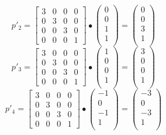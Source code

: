 \documentclass{article}
\begin{document}
	\[
		p'_{2} =
		\begin{bmatrix}
			3 & 0 & 0 & 0 \\
			0 & 3 & 0 & 0 \\
			0 & 0 & 3 & 0 \\
			0 & 0 & 0 & 1
		\end{bmatrix}
		\bullet
		\begin{pmatrix}
			0 \\ 0 \\ 1 \\ 1 \\
		\end{pmatrix}
		=
		\begin{pmatrix}
			0 \\ 0 \\ 3 \\ 1 \\
		\end{pmatrix}
	\]
	\[
		p'_{3} =
		\begin{bmatrix}
			3 & 0 & 0 & 0 \\
			0 & 3 & 0 & 0 \\
			0 & 0 & 3 & 0 \\
			0 & 0 & 0 & 1
		\end{bmatrix}
		\bullet
		\begin{pmatrix}
			1 \\ 0 \\ 0 \\ 1 \\
		\end{pmatrix}
		=
		\begin{pmatrix}
			3 \\ 0 \\ 0 \\ 1 \\
		\end{pmatrix}
	\]
	\[
		p'_{4} =
		\begin{bmatrix}
			3 & 0 & 0 & 0 \\
			0 & 3 & 0 & 0 \\
			0 & 0 & 3 & 0 \\
			0 & 0 & 0 & 1
		\end{bmatrix}
		\bullet
		\begin{pmatrix}
			-1 \\ 0 \\ -1 \\ 1 \\
		\end{pmatrix}
		=
		\begin{pmatrix}
			-3 \\ 0 \\ -3 \\ 1 \\
		\end{pmatrix}
	\]
\end{document}
